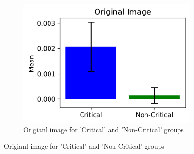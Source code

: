 \documentclass[10pt, conference, a4paper, final]{IEEEtran}
\begin{document}
    \begin{figure}[h]
        \centering
        \begin{subfigure}{.25\textwidth}
            \centering
            \includegraphics[width=\linewidth]{paper_images/Originalbar_chart.png}
            \caption{Origianl image for 'Critical' and 'Non-Critical' groups}        
        \end{subfigure}
   

\end{figure}
\end{document}
